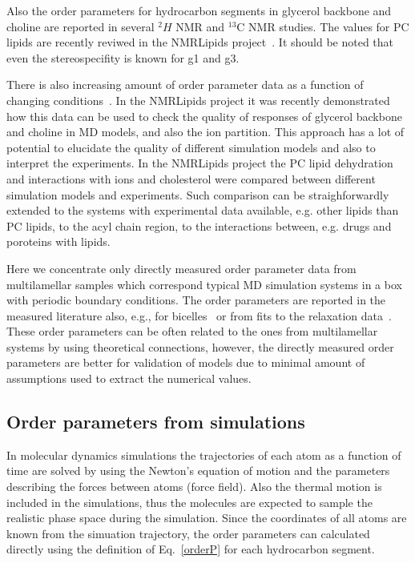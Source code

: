 \documentclass[aps,prl,superscriptaddress,twocolumn]{revtex4}
\begin{document}
Also the order parameters for hydrocarbon segments in glycerol backbone and choline are reported in several 
$^2H$ NMR and $^{13}$C NMR studies. The values for PC lipids are recently reviwed in the NMRLipids project~\cite{botan15}.
It should be noted that even the stereospecifity is known for g1 and g3.

There is also increasing amount of order parameter data as a function of changing conditions~\cite{??}.
In the NMRLipids project it was recently demonstrated how this data can be used to check the quality of responses of 
glycerol backbone and choline in MD models, and also the ion partition. This approach has a lot of potential to elucidate 
the quality of different simulation models and also to interpret the experiments. In the NMRLipids project the PC lipid 
dehydration and interactions with ions and cholesterol were compared between different simulation models and experiments. 
Such comparison can be straighforwardly extended to the systems with experimental data available, e.g. other lipids than PC lipids,
to the acyl chain region, to the interactions between, e.g. drugs and poroteins with lipids.

Here we concentrate only directly measured order parameter data from multilamellar samples which correspond typical
MD simulation systems in a box with periodic boundary conditions. The order parameters are reported in the
measured literature also, e.g., for bicelles~\cite{aussenac03,raffard00,sanders92} or from fits to the relaxation
data~\cite{??}. These order parameters can be often related to the ones from multilamellar systems by using
theoretical connections, however, the directly measured order parameters are better for validation of
models due to minimal amount of assumptions used to extract the numerical values.



\subsection{Order parameters from simulations}
In molecular dynamics simulations the trajectories of each atom as a function of time 
are solved by using the Newton's equation of motion and the parameters describing the 
forces between atoms (force field). Also the thermal motion is included in the simulations, thus 
the molecules are expected to sample the realistic phase space during the simulation.
Since the coordinates of all atoms are known from the simuation trajectory,
the order parameters can calculated directly using the definition of Eq.~\ref{orderP}
for each hydrocarbon segment. 
\end{document}
